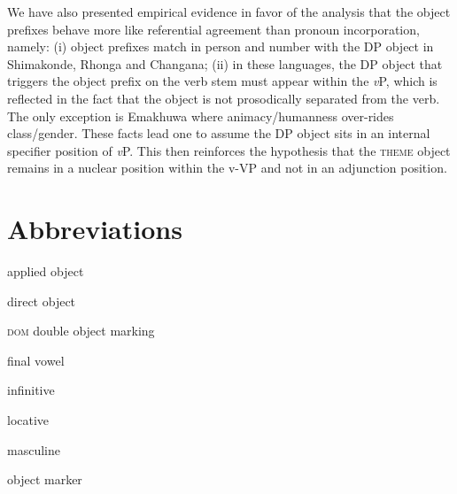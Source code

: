 \documentclass[output=paper]{langsci/langscibook}
\begin{document}
We have also presented empirical evidence in favor of the analysis that the object prefixes behave more like referential agreement than pronoun incorporation, namely: (i) object prefixes match in person and number with the DP object in Shimakonde, Rhonga and Changana; (ii) in these languages, the DP object that triggers the object prefix on the verb stem must appear within the \textit{v}P, which is reflected in the fact that the object is not prosodically separated from the verb. The only exception is Emakhuwa where animacy/humanness over-rides class/gender. These facts lead one to assume the DP object sits in an internal specifier position of \textit{v}P. This then reinforces the hypothesis that the \textsc{theme} object remains in a nuclear position within the v-VP and not in an adjunction position.

\section{ Abbreviations}





applied object




direct object

\textsc{dom}  double object marking

final vowel

infinitive

  locative

masculine

object marker
\end{document}

